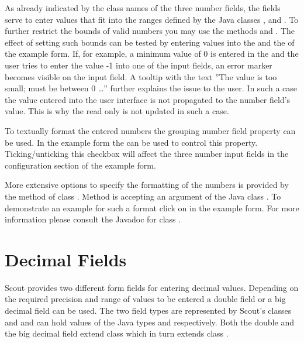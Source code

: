 \documentclass[a4paper,10pt,twoside]{book}
\begin{document}
As already indicated by the class names of the three number fields, the fields serve to enter values that fit into the ranges defined by the Java classes ,  and .
To further restrict the bounds of valid numbers you may use the methods  and .
The effect of setting such bounds can be tested by entering values into the  and the  of the example form.
If, for example, a minimum value of 0 is entered in the  and the user tries to enter the value -1 into one of the input fields, an error marker becomes visible on the input field. 
A tooltip with the text ''The value is too small; must be between 0 \dots'' further explains the issue to the user.
In such a case the value entered into the user interface is not propagated to the number field's value.
This is why the read only  is not updated in such a case.

To textually format the entered numbers the grouping number field property can be used. 
In the example form the  can be used to control this property.
Ticking/unticking this checkbox will affect the three number input fields in the configuration section of the example form.

More extensive options to specify the formatting of the numbers is provided by the method  of class . 
Method  is accepting an argument of the Java class . 
To demonstrate an example for such a format click on  in the example form. 
For more information please consult the Javadoc for class .

\section{Decimal Fields}

Scout provides two different form fields for entering decimal values. 
Depending on the required precision and range of values to be entered a double field or a big decimal field can be used. 
The two field types are represented by Scout's classes  and  and can hold values of the Java types  and  respectively. 
Both the double and the big decimal field extend class  which in turn extends class .
\end{document}
